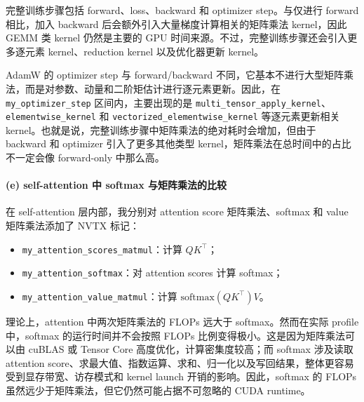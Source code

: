 \documentclass[12pt]{ctexart}
\begin{document}
完整训练步骤包括 forward、loss、backward 和 optimizer step。与仅进行 forward 相比，加入 backward 后会额外引入大量梯度计算相关的矩阵乘法 kernel，因此 GEMM 类 kernel 仍然是主要的 GPU 时间来源。不过，完整训练步骤还会引入更多逐元素 kernel、reduction kernel 以及优化器更新 kernel。

AdamW 的 optimizer step 与 forward/backward 不同，它基本不进行大型矩阵乘法，而是对参数、动量和二阶矩估计进行逐元素更新。因此，在 \texttt{my\_optimizer\_step} 区间内，主要出现的是 \texttt{multi\_tensor\_apply\_kernel}、\texttt{elementwise\_kernel} 和 \texttt{vectorized\_elementwise\_kernel} 等逐元素更新相关 kernel。也就是说，完整训练步骤中矩阵乘法的绝对耗时会增加，但由于 backward 和 optimizer 引入了更多其他类型 kernel，矩阵乘法在总时间中的占比不一定会像 forward-only 中那么高。

\paragraph{(e) self-attention 中 softmax 与矩阵乘法的比较}

在 self-attention 层内部，我分别对 attention score 矩阵乘法、softmax 和 value 矩阵乘法添加了 NVTX 标记：

\begin{itemize}
    \item \texttt{my\_attention\_scores\_matmul}：计算 $QK^\top$；
    \item \texttt{my\_attention\_softmax}：对 attention scores 计算 softmax；
    \item \texttt{my\_attention\_value\_matmul}：计算 $\mathrm{softmax}(QK^\top)V$。
\end{itemize}

理论上，attention 中两次矩阵乘法的 FLOPs 远大于 softmax。然而在实际 profile 中，softmax 的运行时间并不会按照 FLOPs 比例变得极小。这是因为矩阵乘法可以由 cuBLAS 或 Tensor Core 高度优化，计算密集度较高；而 softmax 涉及读取 attention score、求最大值、指数运算、求和、归一化以及写回结果，整体更容易受到显存带宽、访存模式和 kernel launch 开销的影响。因此，softmax 的 FLOPs 虽然远少于矩阵乘法，但它仍然可能占据不可忽略的 CUDA runtime。
\end{document}
